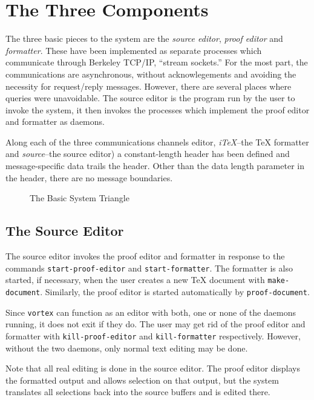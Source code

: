 \section{The Three Components}

The three basic pieces to the {\VorTeX} system are the {\em source
editor}, {\em proof editor} and {\em formatter}.  These have been
implemented as separate processes which communicate through Berkeley
{\UNIX} TCP/IP, ``stream sockets.''  For the most part, the
communications are asynchronous, without acknowlegements and avoiding
the necessity for request/reply messages.  However, there are several
places where queries were unavoidable.  The source editor is the
program run by the user to invoke the system, it then invokes the
processes which implement the proof editor and formatter as daemons.

Along each of the three communications channels editor,
{\em i\TeX}--the {\TeX} formatter and {\em source}--the source editor)
a constant-length header has been defined and message-specific data
trails the header.  Other than the data length parameter in the
header, there are no message boundaries.

\begin{figure}
    \centerline{}
    \caption{The Basic System Triangle}
\end{figure}

\subsection{The Source Editor}

The source editor invokes the proof editor and formatter in response to
the commands {\tt start-proof-editor} and {\tt start-formatter}.
The formatter is also started, if necessary, when the user creates a new
{\TeX} document with {\tt make-document}.  Similarly, the proof editor
is started automatically by {\tt proof-document}.

Since {\tt vortex} can function as an editor with both, one or none of
the daemons running, it does not exit if they do.  The user may get rid
of the proof editor and formatter with {\tt kill-proof-editor} and
{\tt kill-formatter} respectively.  However, without the two daemons,
only normal text editing may be done.

Note that all real editing is done in the source editor.  The proof
editor displays the formatted output and allows selection on that
output, but the system translates all selections back into the source
buffers and is edited there.

